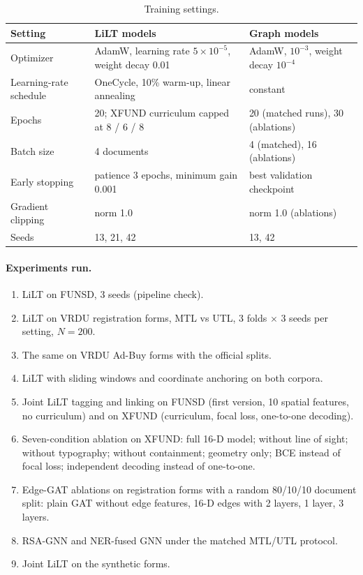 \documentclass[11pt,a4paper]{article}
\begin{document}
\begin{table}[H]
\centering\small
\caption{Training settings.}
\label{tab:setup}
\begin{tabular}{@{}lll@{}}
\toprule
Setting & LiLT models & Graph models \\
\midrule
Optimizer & AdamW, learning rate $5\times10^{-5}$, weight decay 0.01 & AdamW, $10^{-3}$, weight decay $10^{-4}$ \\
Learning-rate schedule & OneCycle, 10\% warm-up, linear annealing & constant \\
Epochs & 20; XFUND curriculum capped at 8 / 6 / 8 & 20 (matched runs), 30 (ablations) \\
Batch size & 4 documents & 4 (matched), 16 (ablations) \\
Early stopping & patience 3 epochs, minimum gain 0.001 & best validation checkpoint \\
Gradient clipping & norm 1.0 & norm 1.0 (ablations) \\
Seeds & 13, 21, 42 & 13, 42 \\
\bottomrule
\end{tabular}
\end{table}

\paragraph{Experiments run.}
\begin{enumerate}
  \item LiLT on FUNSD, 3 seeds (pipeline check).
  \item LiLT on VRDU registration forms, MTL vs UTL, 3 folds $\times$ 3 seeds per setting, $N=200$.
  \item The same on VRDU Ad-Buy forms with the official splits.
  \item LiLT with sliding windows and coordinate anchoring on both corpora.
  \item Joint LiLT tagging and linking on FUNSD (first version, 10 spatial features, no curriculum) and on XFUND (curriculum, focal loss, one-to-one decoding).
  \item Seven-condition ablation on XFUND: full 16-D model; without line of sight; without typography; without containment; geometry only; BCE instead of focal loss; independent decoding instead of one-to-one.
  \item Edge-GAT ablations on registration forms with a random 80/10/10 document split: plain GAT without edge features, 16-D edges with 2 layers, 1 layer, 3 layers.
  \item RSA-GNN and NER-fused GNN under the matched MTL/UTL protocol.
  \item Joint LiLT on the synthetic forms.
\end{enumerate}
\end{document}
